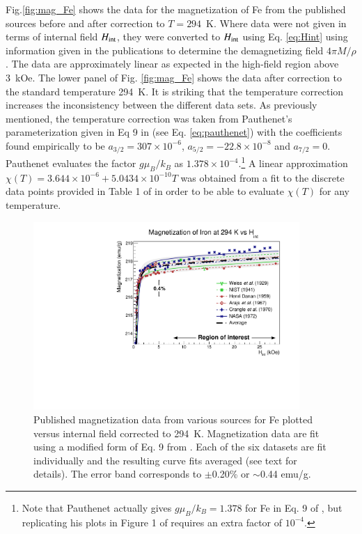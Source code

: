 \documentclass[preprint,12pt]{elsarticle}
\begin{document}
Fig.\ref{fig:mag_Fe} shows the data for the magnetization of Fe from the published sources before and after correction to $T=294$~K. Where data were not given in terms of internal field $H_{\rm int}$, they were converted to $H_{\rm int}$ using Eq. \ref{eq:Hint} using information given in the publications to determine the demagnetizing field $4\pi M/\rho$. The data are approximately linear as expected in the high-field region above 3~kOe. The lower panel of Fig. \ref{fig:mag_Fe}  shows the data after correction to the standard temperature 294~K. It is striking that the temperature correction increases the inconsistency between the different data sets. As previously mentioned, the temperature correction was taken from Pauthenet's parameterization given in Eq 9 in \cite{PauthenetMar1982} (see Eq. \ref{eq:pauthenet}) with the coefficients found empirically to be $a_{3/2}=307\times 10^{-6}$,  $a_{5/2}=-22.8\times10^{-8}$ and $a_{7/2}=0$. Pauthenet evaluates the factor $g\mu_B/k_B$ as $1.378\times10^{-4}$.\footnote{Note that Pauthenet actually gives $g\mu_B/k_B=1.378$ for Fe in Eq. 9  of \cite{PauthenetMar1982}, but  replicating his plots in Figure 1 of \cite{PauthenetMar1982} requires an extra factor of $10^{-4}$.} A linear approximation $\chi(T)=3.644\times10^{-6}+5.0434\times10^{-10}T$ was obtained from a fit to the discrete data points provided in Table 1 of \cite{PauthenetMar1982} in order to be able to evaluate $\chi(T)$ for any temperature. 

\begin{figure}
\centering
\includegraphics[width=0.9\textwidth]{FeComboPlotWithErrorBand.pdf}
\caption{Published magnetization data from various sources for Fe plotted versus internal field corrected to 294~K. Magnetization data are fit using a modified form of Eq. 9 from \cite{PauthenetMar1982}. Each of the six datasets are fit individually and the resulting curve fits averaged (see text for details). The error band corresponds to $\pm$0.20\% or $\sim$0.44 {\rm emu/g}. }
\label{fig:mag_errorband_Fe}
\end{figure}
\end{document}

